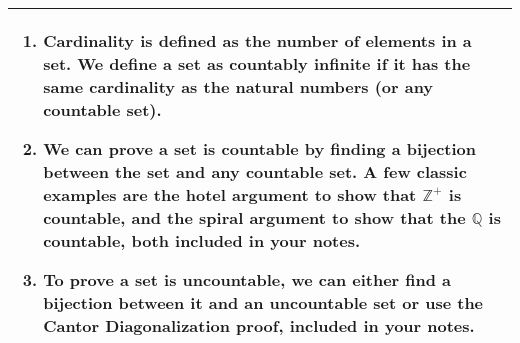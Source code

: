 {\tabulinesep=1mm
\begin{tabu}{|p{16cm} |}
\hline
\begin{enumerate}[label=(\alph*.)]
\item
Cardinality is defined as the number of elements in a set. We define a set as countably infinite if it has the same cardinality as the natural numbers (or any countable set). 


\item 
We can prove a set is countable by finding a bijection between the set and any countable set. A few classic examples are the hotel argument to show that $\mathbb{Z}^+$ is countable, and the spiral argument to show that the $\mathbb{Q}$ is countable, both included in your notes. 
\item 
To prove a set is uncountable, we can either find a bijection between it and an uncountable set or use the Cantor Diagonalization proof, included in your notes. 


\end{enumerate}
\\
\hline
\end{tabu}
}